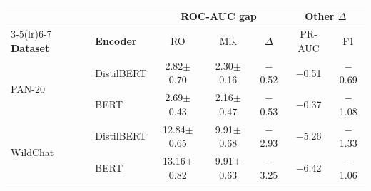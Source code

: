 \documentclass[11pt]{article}
\renewcommand{\arraystretch}{1.05}
\begin{document}
\begingroup
\renewcommand{\arraystretch}{0.78}
\setlength{\tabcolsep}{2pt}
\captionsetup{skip=1pt}
\vspace{-0.3em}
\begin{center}
\begin{minipage}{0.98\columnwidth}
\centering
\tiny
\begin{tabular}{l l c c c c c}
\toprule
& & \multicolumn{3}{c}{\textbf{ROC-AUC gap}} & \multicolumn{2}{c}{\textbf{Other $\Delta$}} \\
\cmidrule(lr){3-5}\cmidrule(lr){6-7}
\textbf{Dataset} & \textbf{Encoder} & RO & Mix & $\Delta$ & PR-AUC & F1 \\
\midrule
\multirow{2}{*}{PAN-20}
 & DistilBERT  & 2.82$\pm$0.70 & 2.30$\pm$0.16 & $-$0.52 & $-$0.51 & $-$0.69 \\
 & BERT        & 2.69$\pm$0.43 & 2.16$\pm$0.47 & $-$0.53 & $-$0.37 & $-$1.08 \\
\midrule
\multirow{2}{*}{WildChat}
 & DistilBERT  & 12.84$\pm$0.65 & \phantom{0}9.91$\pm$0.68 & $-$2.93 & $-$5.26 & $-$1.33 \\
 & BERT        & 13.16$\pm$0.82 & \phantom{0}9.91$\pm$0.63 & $-$3.25 & $-$6.42 & $-$1.06 \\
\bottomrule
\end{tabular}
\label{tab:app_sbert_gap_all}
\end{minipage}
\end{center}
\endgroup
\end{document}

